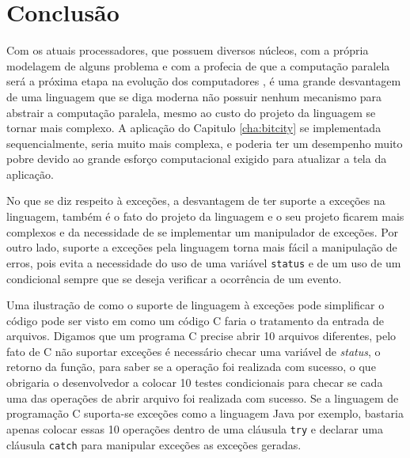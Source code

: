 \chapter{Conclusão}
\label{cha:conclusao}

Com os atuais processadores, que possuem diversos núcleos, com a própria
modelagem de alguns problema e com a profecia de que a computação paralela
será a próxima etapa na evolução dos computadores \cite{TM}, é uma grande
desvantagem de uma linguagem que se diga moderna não possuir nenhum
mecanismo para abstrair a computação paralela, mesmo ao custo do projeto da
linguagem se tornar mais complexo. A aplicação do Capitulo
\ref{cha:bitcity} se implementada sequencialmente, seria muito mais
complexa, e poderia ter um desempenho muito pobre devido ao grande esforço
computacional exigido para atualizar a tela da aplicação.

No que se diz respeito à exceções, a desvantagem de ter suporte a
exceções na linguagem, também é o fato do projeto da linguagem e o seu projeto
ficarem mais complexos e da necessidade de se implementar um manipulador
de exceções. Por outro lado, suporte a exceções pela linguagem torna
mais fácil a manipulação de erros, pois evita a necessidade do uso de
uma variável \texttt{status} e de um uso de um condicional sempre que se
deseja verificar a ocorrência de um evento.

Uma ilustração de como o suporte de linguagem à exceções pode simplificar
o código pode ser visto em como um código C faria o tratamento da entrada de
arquivos. Digamos que um programa C precise abrir 10 arquivos diferentes, pelo
fato de C não suportar exceções é necessário checar uma variável de {\it
status}, o retorno da função, para saber se a operação foi realizada com
sucesso, o que obrigaria o desenvolvedor a colocar 10 testes condicionais para
checar se cada uma das operações de abrir arquivo foi realizada com
sucesso. Se a linguagem de programação C suporta-se exceções como a
linguagem Java por exemplo, bastaria apenas colocar essas 10 operações
dentro de uma cláusula \texttt{try} e declarar uma cláusula \texttt{catch}
para manipular exceções as exceções geradas.
